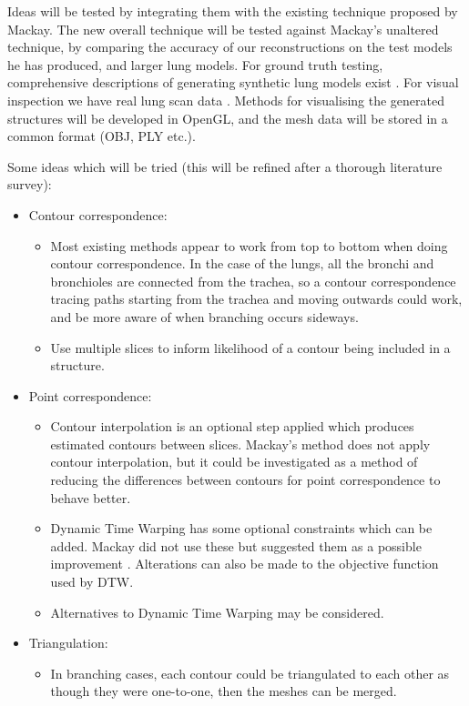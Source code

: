 \documentclass[12pt]{article}
\begin{document}
Ideas will be tested by integrating them with the existing technique proposed by Mackay. The new overall technique will be tested against Mackay’s unaltered technique, by comparing the accuracy of our reconstructions on the test models he has produced, and larger lung models. For ground truth testing, comprehensive descriptions of generating synthetic lung models exist \cite{pluta2012new}. For visual inspection we have real lung scan data \cite{mukundan2016reconstruction}. Methods for visualising the generated structures will be developed in OpenGL, and the mesh data will be stored in a common format (OBJ, PLY etc.). 

Some ideas which will be tried (this will be refined after a thorough literature survey):
\begin{itemize}
\item Contour correspondence:
\begin{itemize}
\item Most existing methods appear to work from top to bottom when doing contour correspondence. In the case of the lungs, all the bronchi and bronchioles are connected from the trachea, so a contour correspondence tracing paths starting from the trachea and moving outwards could work, and be more aware of when branching occurs sideways.
\item Use multiple slices to inform likelihood of a contour being included in a structure.
\end{itemize}

\item Point correspondence:
\begin{itemize}
\item Contour interpolation is an optional step applied which produces estimated contours between slices. Mackay’s method does not apply contour interpolation, but it could be investigated as a method of reducing the differences between contours for point correspondence to behave better.
\item Dynamic Time Warping has some optional constraints which can be added. Mackay did not use these but suggested them as a possible improvement \cite{mackay2019robust}. Alterations can also be made to the objective function used by DTW.
\item Alternatives to Dynamic Time Warping may be considered.
\end{itemize}

\item Triangulation:
\begin{itemize}
\item In branching cases, each contour could be triangulated to each other as though they were one-to-one, then the meshes can be merged.
\end{itemize}
\end{itemize}
\end{document}
